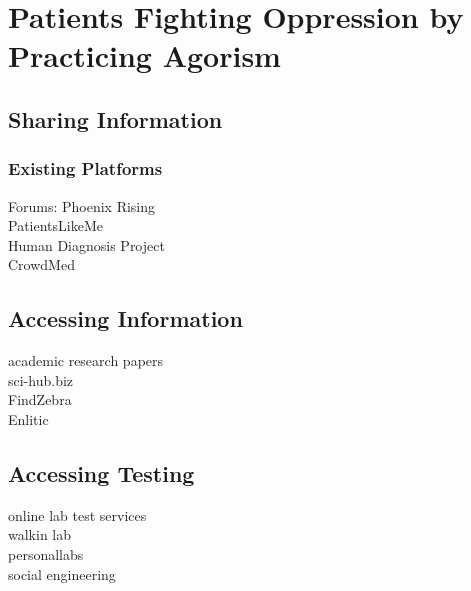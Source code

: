 \documentclass{article}
\begin{document}
\section{Patients Fighting Oppression by Practicing Agorism}

\subsection{Sharing Information}



\subsubsection{Existing Platforms}
Forums: Phoenix Rising\\
PatientsLikeMe\\
Human Diagnosis Project\\
CrowdMed\\

\subsection{Accessing Information}
academic research papers\\
sci-hub.biz\\
FindZebra\\
Enlitic

\cite{scholz2016platform}



\subsection{Accessing Testing}


online lab test services\\
walkin lab\\
personallabs\\
social engineering\\
\end{document}
